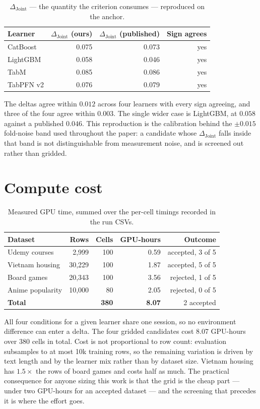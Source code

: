 \documentclass[10pt,letterpaper]{article}
\newcommand{\dj}{\Delta_{\mathrm{Joint}}}
\begin{document}
\begin{table}[H]
\centering\small
\caption{$\dj$ --- the quantity the criterion consumes --- reproduced on the anchor.}
\begin{tabular}{lrrr}
\toprule
Learner & $\dj$ (ours) & $\dj$ (published) & Sign agrees \\
\midrule
CatBoost  & 0.075 & 0.073 & yes \\
LightGBM  & 0.058 & 0.046 & yes \\
TabM      & 0.085 & 0.086 & yes \\
TabPFN v2 & 0.076 & 0.079 & yes \\
\bottomrule
\end{tabular}
\end{table}

\noindent The deltas agree within $0.012$ across four learners with every sign agreeing, and three of the
four agree within $0.003$. The single wider case is LightGBM, at $0.058$ against a published
$0.046$. This reproduction is the calibration behind the $\pm 0.015$ fold-noise band used
throughout the paper: a candidate whose $\dj$ falls inside that band is not distinguishable
from measurement noise, and is screened out rather than gridded.


\section{Compute cost}
\label{app:cost}

\begin{table}[H]
\centering\small
\caption{Measured GPU time, summed over the per-cell timings recorded in the run CSVs.}
\begin{tabular}{lrrrr}
\toprule
Dataset & Rows & Cells & GPU-hours & Outcome \\
\midrule
Udemy courses    & 2{,}999  & 100 & 0.59 & accepted, 3 of 5 \\
Vietnam housing  & 30{,}229 & 100 & 1.87 & accepted, 5 of 5 \\
Board games      & 20{,}343 & 100 & 3.56 & rejected, 1 of 5 \\
Anime popularity & 10{,}000 &  80 & 2.05 & rejected, 0 of 5 \\
\midrule
\textbf{Total}   &          & \textbf{380} & \textbf{8.07} & 2 accepted \\
\bottomrule
\end{tabular}
\end{table}

\noindent All four conditions for a given learner share one session, so no environment difference can
enter a delta. The four gridded candidates cost 8.07 GPU-hours over 380 cells in total. Cost is
not proportional to row count: evaluation subsamples to at most 10k training rows, so the
remaining variation is driven by text length and by the learner mix rather than by dataset
size. Vietnam housing has $1.5\times$ the rows of board games and costs half as much. The
practical consequence for anyone sizing this work is that the grid is the cheap part --- under
two GPU-hours for an accepted dataset --- and the screening that precedes it is where the
effort goes.
\end{document}
